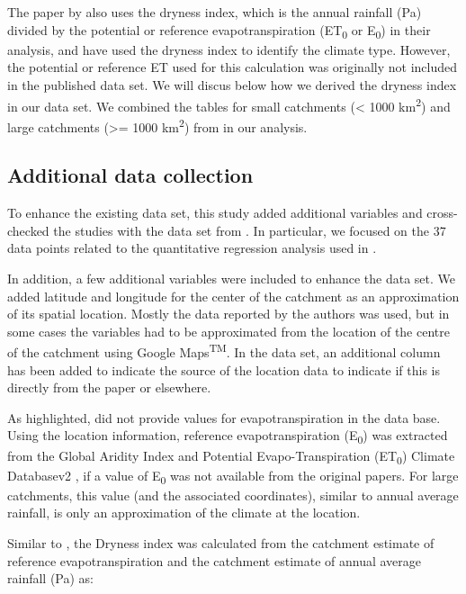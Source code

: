 \documentclass[]{elsarticle} %
\begin{document}
The paper by \citet{zhang2017} also uses the dryness index, which is the annual rainfall (Pa) divided by the potential or reference evapotranspiration (ET\textsubscript{0} or E\textsubscript{0}) in their analysis, and have used the dryness index to identify the climate type. However, the potential or reference ET used for this calculation was originally not included in the published data set. We will discus below how we derived the dryness index in our data set. We combined the tables for small catchments (\textless{} 1000 km\textsuperscript{2}) and large catchments (\textgreater= 1000 km\textsuperscript{2}) from \citet{zhang2017} in our analysis.

\hypertarget{additional-data-collection}{%
\subsection{Additional data collection}\label{additional-data-collection}}

To enhance the existing data set, this study added additional variables and cross-checked the studies with the data set from \citet{filoso2017}. In particular, we focused on the 37 data points related to the quantitative regression analysis used in \citet{filoso2017}.

In addition, a few additional variables were included to enhance the data set. We added latitude and longitude for the center of the catchment as an approximation of its spatial location. Mostly the data reported by the authors was used, but in some cases the variables had to be approximated from the location of the centre of the catchment using Google Maps\textsuperscript{TM}. In the data set, an additional column has been added to indicate the source of the location data to indicate if this is directly from the paper or elsewhere.

As highlighted, \citet{zhang2017} did not provide values for evapotranspiration in the data base. Using the location information, reference evapotranspiration (E\textsubscript{0}) was extracted from the Global Aridity Index and Potential Evapo-Transpiration (ET\textsubscript{0}) Climate Databasev2 \citep{trabucco2018}, if a value of E\textsubscript{0} was not available from the original papers. For large catchments, this value (and the associated coordinates), similar to annual average rainfall, is only an approximation of the climate at the location.

Similar to \citet{zhang2017}, the Dryness index was calculated from the catchment estimate of reference evapotranspiration and the catchment estimate of annual average rainfall (Pa) as:
\end{document}
